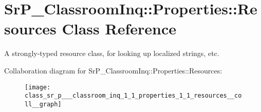 \hypertarget{class_sr_p___classroom_inq_1_1_properties_1_1_resources}{
\section{\-Sr\-P\-\_\-\-Classroom\-Inq\-:\-:\-Properties\-:\-:\-Resources \-Class \-Reference}
\label{class_sr_p___classroom_inq_1_1_properties_1_1_resources}
}


\-A strongly-\/typed resource class, for looking up localized strings, etc.  




\-Collaboration diagram for \-Sr\-P\-\_\-\-Classroom\-Inq\-:\-:\-Properties\-:\-:\-Resources\-:\nopagebreak
\begin{figure}[H]
\begin{center}
\leavevmode
\texttt{[image: class\_sr\_p\_\_\_classroom\_inq\_1\_1\_properties\_1\_1\_resources\_\_coll\_\_graph]}
\end{center}
\end{figure}
